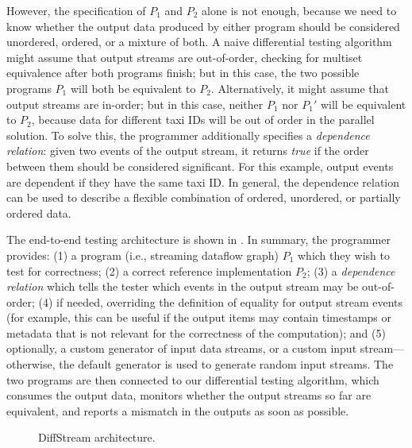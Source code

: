However, the specification of $P_1$ and $P_2$ alone is not enough, because we need to know whether the output data produced by either program should be considered unordered, ordered, or a mixture of both.
A naive differential testing algorithm might assume that output streams are out-of-order, checking for multiset equivalence after both programs finish; but in this case, the two possible programs $P_1$ will both be equivalent to $P_2$. Alternatively, it might assume that output streams are in-order; but in this case, neither $P_1$ nor $P_1'$ will be equivalent to $P_2$, because data for different taxi IDs will be out of order in the parallel solution.
To solve this, the programmer additionally specifies a \emph{dependence relation}: given two events of the output stream, it returns \emph{true} if the order between them should be considered significant. For this example, output events are dependent if they have the same taxi ID. In general, the dependence relation can be used to describe a flexible
combination of ordered, unordered, or partially ordered data.

The end-to-end testing architecture is shown in . In summary, the programmer provides: (1) a program (i.e., streaming dataflow graph) $P_1$ which they wish to test for correctness; (2) a correct reference implementation $P_2$; (3) a \emph{dependence relation} which tells the tester which events in the output stream may be out-of-order;
(4) if needed, overriding the definition of equality for output stream events (for example, this can be useful if the output items may contain timestamps or metadata that is not relevant for the correctness of the computation); and
(5) optionally, a custom generator of input data streams, or a custom input stream---otherwise, the default generator is used to generate random input streams. The two programs are then connected to our differential testing algorithm, which consumes the output data, monitors whether the output streams so far are equivalent, and reports a mismatch
in the outputs as soon as possible.

\begin{figure}[tb]
\centering
\small


\caption{DiffStream architecture.}
\label{diffstream:fig:system-architecture}
\end{figure}


